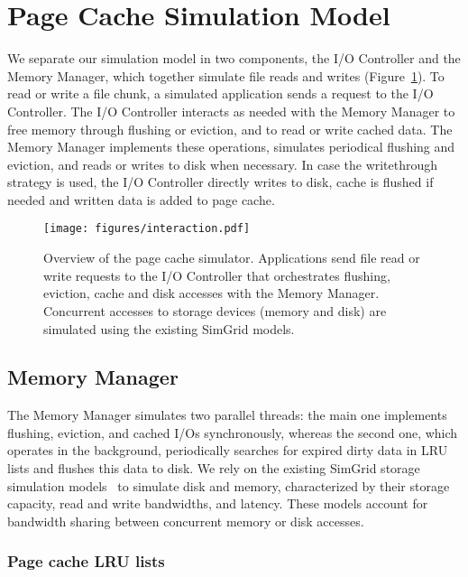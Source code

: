 \documentclass[conference]{IEEEtran}
\begin{document}
    \section{Page Cache Simulation Model}
    \label{method}

    We separate our simulation model in two components, the I/O
    Controller and the Memory Manager, which together simulate
    file reads and writes (Figure~\ref{fig:interaction}).
    To read or write a file chunk, a simulated application sends a
    request to the I/O Controller. The I/O Controller interacts as needed with
    the Memory Manager to free memory through flushing or eviction,
    and to read or write cached data. The Memory Manager
    implements these operations, simulates periodical flushing
    and eviction, and reads or writes to disk when necessary.
    In case the writethrough strategy is used, the I/O Controller directly writes to disk, 
    cache is flushed if needed and written data is added to page cache.

    \begin{figure}
           \centering
           \texttt{[image: figures/interaction.pdf]}
           \caption{Overview of the page cache simulator.
           Applications send file read or write requests to the
           I/O Controller that orchestrates flushing, eviction, cache
           and disk accesses with the Memory Manager. Concurrent accesses to storage
           devices (memory and disk) are simulated using the existing SimGrid models.}
           \label{fig:interaction}
    \end{figure}

    \subsection{Memory Manager}

    The Memory Manager simulates two parallel threads: the main one
    implements flushing, eviction, and cached I/Os synchronously, whereas
    the second one, which operates in the background, periodically searches for
    expired dirty data in LRU lists and flushes this data to disk. We
    rely on the existing SimGrid storage simulation models~\cite{lebre2015} to simulate disk and
    memory, characterized by their storage capacity, read and write
    bandwidths, and latency. These models account for
    bandwidth sharing between concurrent memory or disk accesses.

    \subsubsection{Page cache LRU lists}
\end{document}
